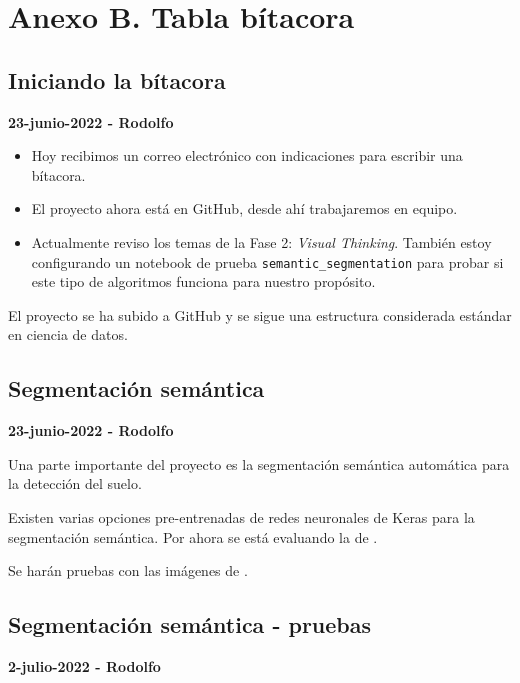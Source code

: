 \section*{Anexo B. Tabla bítacora}


\subsection*{Iniciando la bítacora}

\textbf{23-junio-2022 - Rodolfo}


\begin{itemize}
    \item Hoy recibimos un correo electrónico con indicaciones para escribir una bítacora.
    \item El proyecto ahora está en GitHub, desde ahí trabajaremos en equipo.
    \item Actualmente reviso los temas de la Fase 2: \textit{Visual Thinking}.
     También estoy configurando un notebook de prueba \texttt{semantic\_segmentation} para probar si este tipo de algoritmos funciona para nuestro propósito.
\end{itemize}


El proyecto se ha subido a GitHub y se sigue una estructura considerada estándar en ciencia de datos.

\subsection*{Segmentación semántica}

\textbf{23-junio-2022 - Rodolfo}

Una parte importante del proyecto es la segmentación semántica automática para la detección del suelo.

Existen varias opciones pre-entrenadas de redes neuronales de Keras para la segmentación semántica. Por ahora se está evaluando la de \textcite{gupta2022}.

Se harán pruebas con las imágenes de \textcite{unity2022}.

\subsection*{Segmentación semántica - pruebas}

\textbf{2-julio-2022 - Rodolfo}

